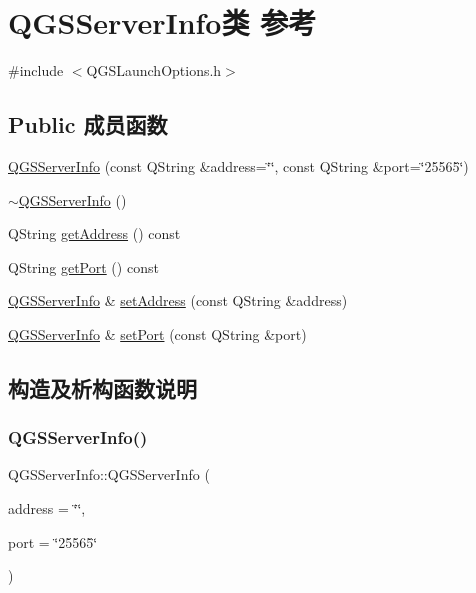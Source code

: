 \hypertarget{class_q_g_s_server_info}{}\section{Q\+G\+S\+Server\+Info类 参考}
\label{class_q_g_s_server_info}


{\ttfamily \#include $<$Q\+G\+S\+Launch\+Options.\+h$>$}

\subsection*{Public 成员函数}
\begin{DoxyCompactItemize}
\item 
\mbox{\hyperlink{class_q_g_s_server_info_a2874324b43fed5aa8f187e4e9fed6c61}{Q\+G\+S\+Server\+Info}} (const Q\+String \&address=\char`\"{}\char`\"{}, const Q\+String \&port=\char`\"{}25565\char`\"{})
\item 
\mbox{\hyperlink{class_q_g_s_server_info_ad49db6fa4e6005c2c38fc2d658c197dc}{$\sim$\+Q\+G\+S\+Server\+Info}} ()
\item 
Q\+String \mbox{\hyperlink{class_q_g_s_server_info_a65975875c5c2f71d9eab41c50d42d0b5}{get\+Address}} () const
\item 
Q\+String \mbox{\hyperlink{class_q_g_s_server_info_a18636ce9bd65569034daf0cbc95391cd}{get\+Port}} () const
\item 
\mbox{\hyperlink{class_q_g_s_server_info}{Q\+G\+S\+Server\+Info}} \& \mbox{\hyperlink{class_q_g_s_server_info_a8b12570be75e62455bcc95ce202a3d31}{set\+Address}} (const Q\+String \&address)
\item 
\mbox{\hyperlink{class_q_g_s_server_info}{Q\+G\+S\+Server\+Info}} \& \mbox{\hyperlink{class_q_g_s_server_info_a374a34addce32de879ce4735699c196f}{set\+Port}} (const Q\+String \&port)
\end{DoxyCompactItemize}


\subsection{构造及析构函数说明}
\mbox{\label{class_q_g_s_server_info_a2874324b43fed5aa8f187e4e9fed6c61}} 
\subsubsection{\texorpdfstring{Q\+G\+S\+Server\+Info()}{QGSServerInfo()}}
{\footnotesize\ttfamily Q\+G\+S\+Server\+Info\+::\+Q\+G\+S\+Server\+Info (\begin{DoxyParamCaption}\item[{const Q\+String \&}]{address = {\ttfamily \char`\"{}\char`\"{}},  }\item[{const Q\+String \&}]{port = {\ttfamily \char`\"{}25565\char`\"{}} }\end{DoxyParamCaption})}

